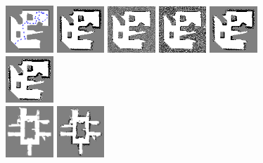 \documentclass[letterpaper, 10 pt, conference]{ieeeconf} %
\begin{document}
\begin{figure}
  \includegraphics[width=0.16\textwidth]{../figures/cave_gt.png}%
  \includegraphics[width=0.16\textwidth]{../figures/cave_TwoAssumptionAlgo.png}%
  \includegraphics[width=0.16\textwidth]{../figures/cave_SICKSlowMetropolis.png}%
  \includegraphics[width=0.16\textwidth]{../figures/cave_SICKDDMCMC.png}%
  \includegraphics[width=0.16\textwidth]{../figures/cave_run_belief_propagation.png}%
  \includegraphics[width=0.16\textwidth]{../figures/cave_dualdecomposition.png}\\
  \includegraphics[width=0.16\textwidth]{../../Data/hospital_player/gt-final.png}%
  \includegraphics[width=0.16\textwidth]{../../Data/hospital_player/TwoAssumptionAlgo.png}%

\end{figure}
\end{document}
